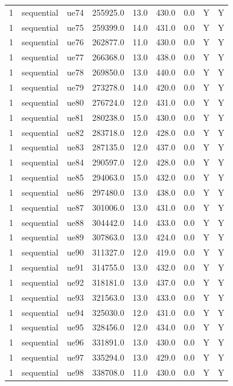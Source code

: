 \begin{table}[ht]
\begin{tabular}{|c|c|c|c|c|c|c|c|c|}
1 & sequential & ue74 & 255925.0 & 13.0 & 430.0 & 0.0 & Y & Y \\
1 & sequential & ue75 & 259399.0 & 14.0 & 431.0 & 0.0 & Y & Y \\
1 & sequential & ue76 & 262877.0 & 11.0 & 430.0 & 0.0 & Y & Y \\
1 & sequential & ue77 & 266368.0 & 13.0 & 438.0 & 0.0 & Y & Y \\
1 & sequential & ue78 & 269850.0 & 13.0 & 440.0 & 0.0 & Y & Y \\
1 & sequential & ue79 & 273278.0 & 14.0 & 420.0 & 0.0 & Y & Y \\
1 & sequential & ue80 & 276724.0 & 12.0 & 431.0 & 0.0 & Y & Y \\
1 & sequential & ue81 & 280238.0 & 15.0 & 430.0 & 0.0 & Y & Y \\
1 & sequential & ue82 & 283718.0 & 12.0 & 428.0 & 0.0 & Y & Y \\
1 & sequential & ue83 & 287135.0 & 12.0 & 437.0 & 0.0 & Y & Y \\
1 & sequential & ue84 & 290597.0 & 12.0 & 428.0 & 0.0 & Y & Y \\
1 & sequential & ue85 & 294063.0 & 15.0 & 432.0 & 0.0 & Y & Y \\
1 & sequential & ue86 & 297480.0 & 13.0 & 438.0 & 0.0 & Y & Y \\
1 & sequential & ue87 & 301006.0 & 13.0 & 431.0 & 0.0 & Y & Y \\
1 & sequential & ue88 & 304442.0 & 14.0 & 433.0 & 0.0 & Y & Y \\
1 & sequential & ue89 & 307863.0 & 13.0 & 424.0 & 0.0 & Y & Y \\
1 & sequential & ue90 & 311327.0 & 12.0 & 419.0 & 0.0 & Y & Y \\
1 & sequential & ue91 & 314755.0 & 13.0 & 432.0 & 0.0 & Y & Y \\
1 & sequential & ue92 & 318181.0 & 13.0 & 437.0 & 0.0 & Y & Y \\
1 & sequential & ue93 & 321563.0 & 13.0 & 433.0 & 0.0 & Y & Y \\
1 & sequential & ue94 & 325030.0 & 12.0 & 431.0 & 0.0 & Y & Y \\
1 & sequential & ue95 & 328456.0 & 12.0 & 434.0 & 0.0 & Y & Y \\
1 & sequential & ue96 & 331891.0 & 13.0 & 430.0 & 0.0 & Y & Y \\
1 & sequential & ue97 & 335294.0 & 13.0 & 429.0 & 0.0 & Y & Y \\
1 & sequential & ue98 & 338708.0 & 11.0 & 430.0 & 0.0 & Y & Y \\

\end{tabular}
\end{table}
